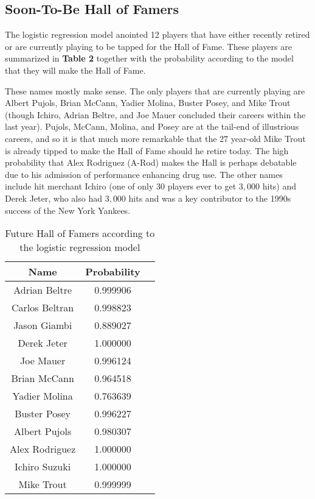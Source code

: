 \documentclass{sigkddExp}
\begin{document}
\subsection{Soon-To-Be Hall of Famers}
The logistic regression model anointed 12 players that have either recently retired or are currently playing to be tapped for the Hall of Fame. These players are summarized in \textbf{Table 2} together with the probability according to the model that they will make the Hall of Fame. 

These names mostly make sense. The only players that are currently playing are Albert Pujols, Brian McCann, Yadier Molina, Buster Posey, and Mike Trout (though Ichiro, Adrian Beltre, and Joe Mauer concluded their careers within the last year). Pujols, McCann, Molina, and Posey are at the tail-end of illustrious careers, and so it is that much more remarkable that the 27 year-old Mike Trout is already tipped to make the Hall of Fame should he retire today. The high probability that Alex Rodriguez (A-Rod) makes the Hall is perhaps debatable due to his admission of performance enhancing drug use. The other names include hit merchant Ichiro (one of only 30 players ever to get $3,000$ hits) and Derek Jeter, who also had $3,000$ hits and was a key contributor to the 1990s success of the New York Yankees.

\begin{table}
\caption{Future Hall of Famers according to the logistic regression model}
\begin{tabular} {|c|c|l|} \hline
Name&Probability\\ \hline
Adrian Beltre&0.999906\\ \hline 
Carlos Beltran&0.998823\\ \hline
Jason Giambi&0.889027\\ \hline
Derek Jeter&1.000000\\ \hline
Joe Mauer&0.996124\\ \hline
Brian McCann&0.964518\\ \hline
Yadier Molina&0.763639\\ \hline
Buster Posey&0.996227\\ \hline
Albert Pujols&0.980307\\ \hline
Alex Rodriguez&1.000000\\ \hline
Ichiro Suzuki&1.000000\\ \hline
Mike Trout&0.999999\\ \hline
\end{tabular}
\end{table}
\end{document}
